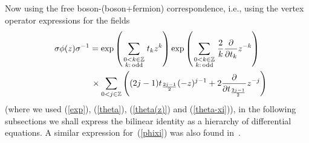 Now using the free boson-(boson+fermion) correspondence, i.e.,
using the vertex operator expressions for the f\/ields
\begin{gather}
\sigma\phi(z)\sigma^{-1} =
\exp\left( \sum_{\scriptstyle0<k\in\mathbb{Z}\atop\scriptstyle k:\,\mathrm{odd}}t_kz^k \right)
\exp\left( \sum_{\scriptstyle0<k\in\mathbb{Z}\atop\scriptstyle k:\,\mathrm{odd}}
\frac{2}{k}\frac{\partial}{\partial t_k}z^{-k} \right)\nonumber\\
\hphantom{\sigma\phi(z)\sigma^{-1} =}{}\times
\sum_{0<j\in\mathbb{Z}}\left( (2j-1)t_{\frac{2j-1}2}(-z)^{j-1}+2\frac{\partial}{\partial
t_{\frac{2j-1}2}}z^{-j} \right)\label{phixi}
\end{gather}
(where we used (\ref{exp}), (\ref{theta}), (\ref{theta(z)}) and (\ref{theta-xi})),
in the following subsections
we shall express the bilinear identity as a hierarchy of dif\/ferential equations.
A similar expression  for~(\ref{phixi}) was also found in~\cite{Kac-Leur}.
